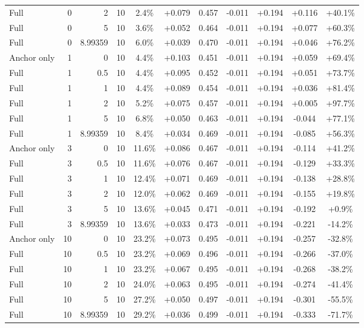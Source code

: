 \begin{table}[htbp]
\begin{tabular}{lrrrccccccc}
Full & 0 & 2 & 10 & 2.4\% & +0.079 & 0.457 & -0.011 & +0.194 & +0.116 & +40.1\% \\
Full & 0 & 5 & 10 & 3.6\% & +0.052 & 0.464 & -0.011 & +0.194 & +0.077 & +60.3\% \\
Full & 0 & 8.99359 & 10 & 6.0\% & +0.039 & 0.470 & -0.011 & +0.194 & +0.046 & +76.2\% \\
Anchor only & 1 & 0 & 10 & 4.4\% & +0.103 & 0.451 & -0.011 & +0.194 & +0.059 & +69.4\% \\
Full & 1 & 0.5 & 10 & 4.4\% & +0.095 & 0.452 & -0.011 & +0.194 & +0.051 & +73.7\% \\
Full & 1 & 1 & 10 & 4.4\% & +0.089 & 0.454 & -0.011 & +0.194 & +0.036 & +81.4\% \\
Full & 1 & 2 & 10 & 5.2\% & +0.075 & 0.457 & -0.011 & +0.194 & +0.005 & +97.7\% \\
Full & 1 & 5 & 10 & 6.8\% & +0.050 & 0.463 & -0.011 & +0.194 & -0.044 & +77.1\% \\
Full & 1 & 8.99359 & 10 & 8.4\% & +0.034 & 0.469 & -0.011 & +0.194 & -0.085 & +56.3\% \\
Anchor only & 3 & 0 & 10 & 11.6\% & +0.086 & 0.467 & -0.011 & +0.194 & -0.114 & +41.2\% \\
Full & 3 & 0.5 & 10 & 11.6\% & +0.076 & 0.467 & -0.011 & +0.194 & -0.129 & +33.3\% \\
Full & 3 & 1 & 10 & 12.4\% & +0.071 & 0.469 & -0.011 & +0.194 & -0.138 & +28.8\% \\
Full & 3 & 2 & 10 & 12.0\% & +0.062 & 0.469 & -0.011 & +0.194 & -0.155 & +19.8\% \\
Full & 3 & 5 & 10 & 13.6\% & +0.045 & 0.471 & -0.011 & +0.194 & -0.192 & +0.9\% \\
Full & 3 & 8.99359 & 10 & 13.6\% & +0.033 & 0.473 & -0.011 & +0.194 & -0.221 & -14.2\% \\
Anchor only & 10 & 0 & 10 & 23.2\% & +0.073 & 0.495 & -0.011 & +0.194 & -0.257 & -32.8\% \\
Full & 10 & 0.5 & 10 & 23.2\% & +0.069 & 0.496 & -0.011 & +0.194 & -0.266 & -37.0\% \\
Full & 10 & 1 & 10 & 23.2\% & +0.067 & 0.495 & -0.011 & +0.194 & -0.268 & -38.2\% \\
Full & 10 & 2 & 10 & 24.0\% & +0.063 & 0.495 & -0.011 & +0.194 & -0.274 & -41.4\% \\
Full & 10 & 5 & 10 & 27.2\% & +0.050 & 0.497 & -0.011 & +0.194 & -0.301 & -55.5\% \\
Full & 10 & 8.99359 & 10 & 29.2\% & +0.036 & 0.499 & -0.011 & +0.194 & -0.333 & -71.7\% \\

\end{tabular}
\end{table}
